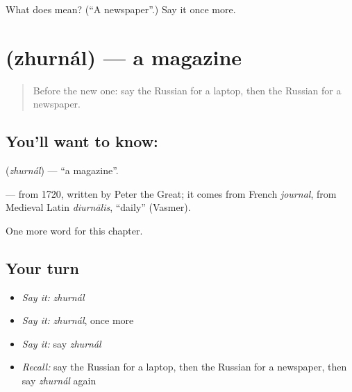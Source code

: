 \begin{tcolorbox}[breakable,colback=teal!4,colframe=teal!35!black,title={Before you move on}]
What does  mean? (\textquotedblleft{}A newspaper\textquotedblright{}.) Say it once more.
\end{tcolorbox}
\section[\texorpdfstring{\ru{журнал} (zhurnál)}{журнал (zhurnál)}]{ (zhurnál) — a magazine}

\label{lesson:RU-C192-zhurnal}



\begin{quote}
Before the new one: say the Russian for a laptop, then the Russian for a newspaper.
\end{quote}

\subsection*{You'll want to know: }
\textbf{} (\emph{zhurnál}) — \textquotedblleft{}a magazine\textquotedblright{}.

\begin{cousinweb}
\textbf{} — from 1720, written \emph{} by Peter the Great; it comes from French \emph{journal}, from Medieval Latin \emph{diurnālis}, \textquotedblleft{}daily\textquotedblright{} (Vasmer).
\end{cousinweb}

\begin{grammarlens}[title={What you've built}]
One more word for this chapter.
\end{grammarlens}

\subsection*{Your turn}
\begin{itemize}
\raggedright
  \item \emph{Say it:} \emph{zhurnál}
  \item \emph{Say it:} \emph{zhurnál}, once more
  \item \emph{Say it:} say \emph{zhurnál}
  \item \emph{Recall:} say the Russian for a laptop, then the Russian for a newspaper, then say \emph{zhurnál} again
\end{itemize}

